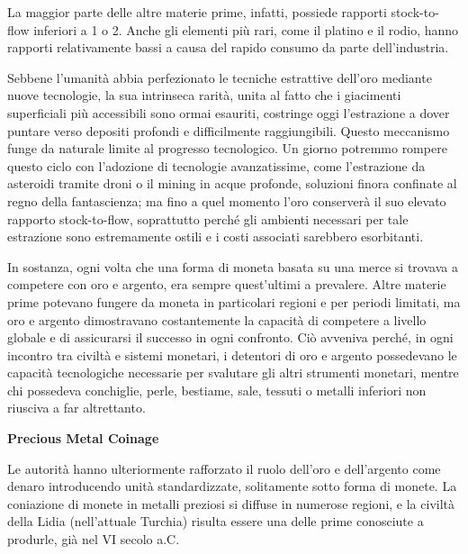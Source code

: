 \documentclass[
  a5paper,
  smalldemyvopaper,10pt,twoside,onecolumn,openright,extrafontsizes,hidelinks]{memoir}
\begin{document}
La maggior parte delle altre materie prime, infatti, possiede rapporti
stock-to-flow inferiori a 1 o 2. Anche gli elementi più rari, come il
platino e il rodio, hanno rapporti relativamente bassi a causa del
rapido consumo da parte dell'industria.

Sebbene l'umanità abbia perfezionato le tecniche estrattive dell'oro
mediante nuove tecnologie, la sua intrinseca rarità, unita al fatto che
i giacimenti superficiali più accessibili sono ormai esauriti, costringe
oggi l'estrazione a dover puntare verso depositi profondi e
difficilmente raggiungibili. Questo meccanismo funge da naturale limite
al progresso tecnologico. Un giorno potremmo rompere questo ciclo con
l'adozione di tecnologie avanzatissime, come l'estrazione da asteroidi
tramite droni o il mining in acque profonde, soluzioni finora confinate
al regno della fantascienza; ma fino a quel momento l'oro conserverà il
suo elevato rapporto stock-to-flow, soprattutto perché gli ambienti
necessari per tale estrazione sono estremamente ostili e i costi
associati sarebbero esorbitanti.

In sostanza, ogni volta che una forma di moneta basata su una merce si
trovava a competere con oro e argento, era sempre quest'ultimi a
prevalere. Altre materie prime potevano fungere da moneta in particolari
regioni e per periodi limitati, ma oro e argento dimostravano
costantemente la capacità di competere a livello globale e di
assicurarsi il successo in ogni confronto. Ciò avveniva perché, in ogni
incontro tra civiltà e sistemi monetari, i detentori di oro e argento
possedevano le capacità tecnologiche necessarie per svalutare gli altri
strumenti monetari, mentre chi possedeva conchiglie, perle, bestiame,
sale, tessuti o metalli inferiori non riusciva a far altrettanto.

\textbf{Precious Metal Coinage}

Le autorità hanno ulteriormente rafforzato il ruolo dell'oro e
dell'argento come denaro introducendo unità standardizzate, solitamente
sotto forma di monete. La coniazione di monete in metalli preziosi si
diffuse in numerose regioni, e la civiltà della Lidia (nell'attuale
Turchia) risulta essere una delle prime conosciute a produrle, già nel
VI secolo a.C.
\end{document}

